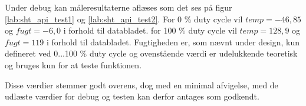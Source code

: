 Under debug kan måleresultaterne aflæses som det ses på figur \ref{lab:sht_api_test1} og \ref{lab:sht_api_test2}. 
For 0 \% duty cycle vil $temp = -46,85$ og $fugt = -6,0$ i forhold til databladet.
for 100 \% duty cycle vil $temp = 128,9$ og $fugt = 119$ i forhold til databladet.
Fugtigheden er, som nævnt under design, kun defineret ved 0...100 \% duty cycle og ovenstående værdi er udelukkende teoretisk og bruges kun for at teste funktionen. 

Disse værdier stemmer godt overens, dog med en minimal afvigelse, med de udlæste værdier for debug og testen kan derfor antages som godkendt.